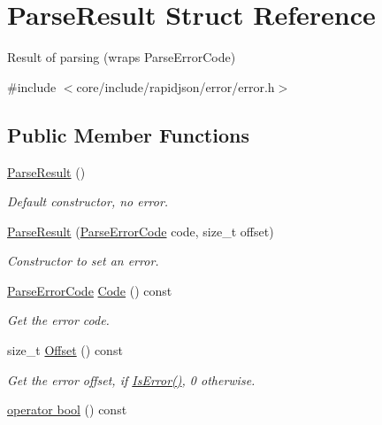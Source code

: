 \hypertarget{structParseResult}{}\section{Parse\+Result Struct Reference}
\label{structParseResult}


Result of parsing (wraps Parse\+Error\+Code)  




{\ttfamily \#include $<$core/include/rapidjson/error/error.\+h$>$}

\subsection*{Public Member Functions}
\begin{DoxyCompactItemize}
\item 
\hyperlink{structParseResult_acd4a266f815bec59fa27f64f1923fe9e}{Parse\+Result} ()
\begin{DoxyCompactList}\small\item\em Default constructor, no error. \end{DoxyCompactList}\item 
\hyperlink{structParseResult_a38ca49a53e80633d0864ad5026adaf84}{Parse\+Result} (\hyperlink{group__RAPIDJSON__ERRORS_ga8d4b32dfc45840bca189ade2bbcb6ba7}{Parse\+Error\+Code} code, size\+\_\+t offset)
\begin{DoxyCompactList}\small\item\em Constructor to set an error. \end{DoxyCompactList}\item 
\hyperlink{group__RAPIDJSON__ERRORS_ga8d4b32dfc45840bca189ade2bbcb6ba7}{Parse\+Error\+Code} \hyperlink{structParseResult_a1062b22f0d006e2f8a5b8c74385ff52d}{Code} () const 
\begin{DoxyCompactList}\small\item\em Get the error code. \end{DoxyCompactList}\item 
size\+\_\+t \hyperlink{structParseResult_aa65430daa3920be0d42dc4baed86df69}{Offset} () const 
\begin{DoxyCompactList}\small\item\em Get the error offset, if \hyperlink{structParseResult_a07c35a6769f5cb8a73cbc56c41e60a2a}{Is\+Error()}, 0 otherwise. \end{DoxyCompactList}\item 
\hyperlink{structParseResult_a74ab79dfa41d390002d1ea188a749bce}{operator bool} () const 

\end{DoxyCompactItemize}

